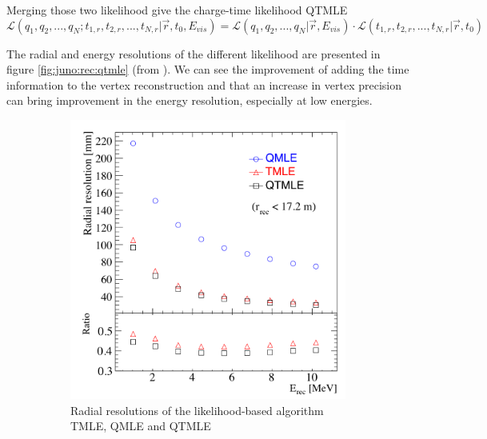 \documentclass[../main.tex]{subfiles}
\begin{document}
Merging those two likelihood give the charge-time likelihood QTMLE
\begin{equation}
  \mathcal{L}(q_1, q_2, ..., q_N; t_{1,r}, t_{2,r}, ..., t_{N,r} | \vec{r}, t_0 , E_{vis}) = \mathcal{L}(q_1, q_2, ..., q_N | \vec{r}, E_{vis}) \cdot \mathcal{L}(t_{1,r}, t_{2,r}, ..., t_{N,r} | \vec{r}, t_0)
\end{equation}

The radial and energy resolutions of the different likelihood are presented in figure \ref{fig:juno:rec:qtmle} (from \cite{huang_data-driven_2023}). We can see the improvement of adding the time information to the vertex reconstruction and that an increase in vertex precision can bring improvement in the energy resolution, especially at low energies.

\begin{figure}[ht]
  \begin{subfigure}{0.48\linewidth}
    \centering
    \includegraphics[width=\textwidth]{images/juno/reco/radial_qtmle.png}
    \caption{Radial resolutions of the likelihood-based algorithm TMLE, QMLE and QTMLE}
  \end{subfigure}
  \hfill
  \begin{subfigure}{0.48\linewidth}
    \centering

\end{subfigure}
\end{figure}
\end{document}
